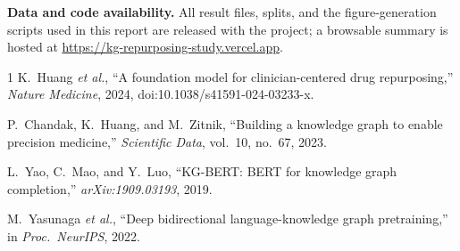 \documentclass[conference]{IEEEtran}
\newcommand{\projecturl}{https://kg-repurposing-study.vercel.app}
\begin{document}
\smallskip
\noindent\textbf{Data and code availability.} All result files, splits, and the
figure-generation scripts used in this report are released with the project; a
browsable summary is hosted at \url{\projecturl}.

\begin{thebibliography}{1}
K.~Huang \emph{et al.}, ``A foundation model for clinician-centered drug
repurposing,'' \emph{Nature Medicine}, 2024, doi:10.1038/s41591-024-03233-x.

P.~Chandak, K.~Huang, and M.~Zitnik, ``Building a knowledge graph to enable
precision medicine,'' \emph{Scientific Data}, vol.~10, no.~67, 2023.

L.~Yao, C.~Mao, and Y.~Luo, ``KG-BERT: BERT for knowledge graph completion,''
\emph{arXiv:1909.03193}, 2019.

M.~Yasunaga \emph{et al.}, ``Deep bidirectional language-knowledge graph
pretraining,'' in \emph{Proc.\ NeurIPS}, 2022.
\end{thebibliography}
\end{document}
